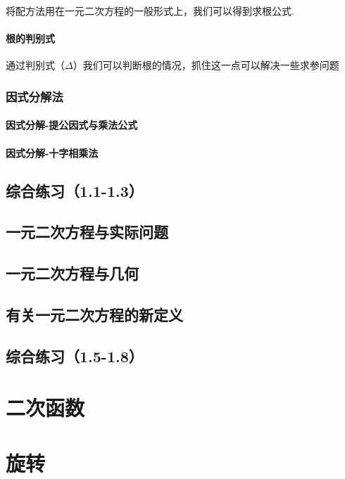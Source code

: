 \documentclass[lang=cn, 10pt, titlestyle=hang, oneside]{elegantbook}
\begin{document}
将配方法用在一元二次方程的一般形式上，我们可以得到求根公式.

\subsubsection{根的判别式}

通过判别式（\(\Delta \)）我们可以判断根的情况，抓住这一点可以解决一些求参问题


\subsection{因式分解法}

\subsubsection{因式分解-提公因式与乘法公式}

\subsubsection{因式分解-十字相乘法}

\section{综合练习（1.1-1.3）}

\section{一元二次方程与实际问题}

\section{一元二次方程与几何}

\section{有关一元二次方程的新定义}

\section{综合练习（1.5-1.8）}

\chapter{二次函数}

\chapter{旋转}
\end{document}
